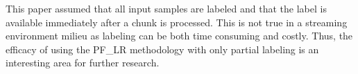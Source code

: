 \documentclass[conference]{IEEEtran}
\begin{document}
This paper assumed that all input samples are labeled and that the label is available immediately after a chunk is processed. This is not true in a streaming environment milieu as labeling can be both time consuming and costly. Thus, the efficacy of using the PF\_LR methodology with only partial labeling is an interesting area for further research. 




%
%
%
\end{document}
